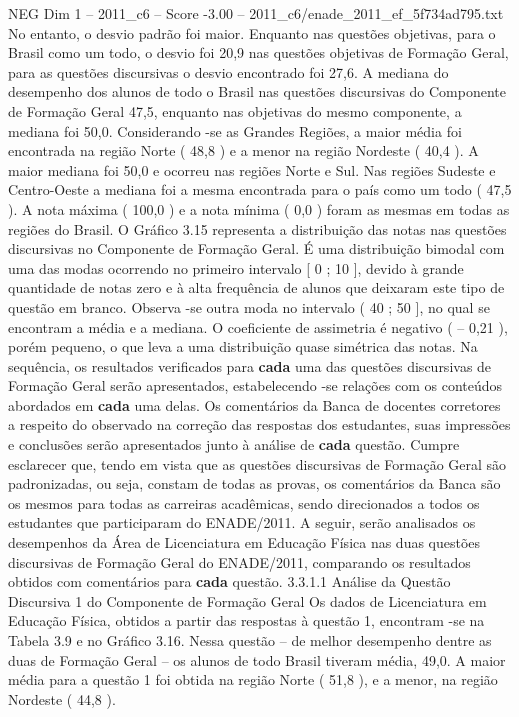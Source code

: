 \begin{textsample}{NEG Dim 1 – 2011\_c6 – Score -3.00 – 2011\_c6/enade\_2011\_ef\_5f734ad795.txt}
No entanto, o desvio padrão foi maior.
Enquanto nas questões objetivas, para o Brasil como um todo, o desvio foi 20,9 nas questões objetivas de Formação Geral, para as questões discursivas o desvio encontrado foi 27,6.
A mediana do desempenho dos alunos de todo o Brasil nas questões discursivas do Componente de Formação Geral 47,5, enquanto nas objetivas do mesmo componente, a mediana foi 50,0.
Considerando -se as Grandes Regiões, a maior média foi encontrada na região Norte ( 48,8 ) e a menor na região Nordeste ( 40,4 ).
A maior mediana foi 50,0 e ocorreu nas regiões Norte e Sul.
Nas regiões Sudeste e Centro-Oeste a mediana foi a mesma encontrada para o país como um todo ( 47,5 ).
A nota máxima ( 100,0 ) e a nota mínima ( 0,0 ) foram as mesmas em todas as regiões do Brasil.
O Gráfico 3.15 representa a distribuição das notas nas questões discursivas no Componente de Formação Geral.
É uma distribuição bimodal com uma das modas ocorrendo no primeiro intervalo [ 0 ; 10 ], devido à grande quantidade de notas zero e à alta frequência de alunos que deixaram este tipo de questão em branco.
Observa -se outra moda no intervalo ( 40 ; 50 ], no qual se encontram a média e a mediana.
O coeficiente de assimetria é negativo ( – 0,21 ), porém pequeno, o que leva a uma distribuição quase simétrica das notas.
Na sequência, os resultados verificados para \textbf{cada} uma das questões discursivas de Formação Geral serão apresentados, estabelecendo -se relações com os conteúdos abordados em \textbf{cada} uma delas.
Os comentários da Banca de docentes corretores a respeito do observado na correção das respostas dos estudantes, suas impressões e conclusões serão apresentados junto à análise de \textbf{cada} questão.
Cumpre esclarecer que, tendo em vista que as questões discursivas de Formação Geral são padronizadas, ou seja, constam de todas as provas, os comentários da Banca são os mesmos para todas as carreiras acadêmicas, sendo direcionados a todos os estudantes que participaram do ENADE/2011.
A seguir, serão analisados os desempenhos da Área de Licenciatura em Educação Física nas duas questões discursivas de Formação Geral do ENADE/2011, comparando os resultados obtidos com comentários para \textbf{cada} questão. 3.3.1.1 Análise da Questão Discursiva 1 do Componente de Formação Geral Os dados de Licenciatura em Educação Física, obtidos a partir das respostas à questão 1, encontram -se na Tabela 3.9 e no Gráfico 3.16.
Nessa questão – de melhor desempenho dentre as duas de Formação Geral – os alunos de todo Brasil tiveram média, 49,0.
A maior média para a questão 1 foi obtida na região Norte ( 51,8 ), e a menor, na região Nordeste ( 44,8 ).

\end{textsample}
